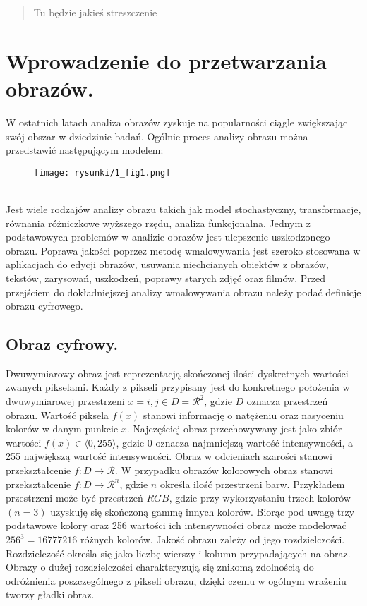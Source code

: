 \documentclass[12pt, twoside, openany]{report}
\theoremstyle{definition}
\begin{document}
\begin{abstract}
Tu będzie jakieś streszczenie
\end{abstract}

\newpage
\printunsrtglossary[type=symbols, style=long, title={Wykaz oznaczeń i symboli}]
    

\chapter{Wprowadzenie do przetwarzania obrazów.}
W ostatnich latach analiza obrazów zyskuje na popularności ciągle zwiększając swój obszar w dziedzinie badań. Ogólnie proces analizy obrazu można przedstawić następującym modelem: \\
\begin{figure}[!h]
	\centering
	\texttt{[image: rysunki/1\_fig1.png]}
\end{figure}
\\
Jest wiele rodzajów analizy obrazu takich jak model stochastyczny, transformacje, równania różniczkowe wyższego rzędu, analiza funkcjonalna. Jednym z podstawowych problemów w analizie obrazów jest ulepszenie uszkodzonego obrazu. Poprawa jakości poprzez metodę wmalowywania jest szeroko stosowana w aplikacjach do edycji obrazów, usuwania niechcianych obiektów z obrazów, tekstów, zarysowań, uszkodzeń, poprawy starych zdjęć oraz filmów. Przed przejściem do dokładniejszej analizy wmalowywania obrazu należy podać definicje obrazu cyfrowego.
\section{Obraz cyfrowy.}
Dwuwymiarowy obraz jest reprezentacją skończonej ilości dyskretnych wartości zwanych pikselami. Każdy z pikseli przypisany jest do konkretnego położenia w dwuwymiarowej przestrzeni $x = {i,j} \in D=\mathcal{R}^2$, gdzie $D$ oznacza przestrzeń obrazu. Wartość piksela $f(x)$ stanowi informację o natężeniu oraz nasyceniu kolorów w danym punkcie $x$. Najczęściej obraz przechowywany jest jako zbiór wartości $f(x) \in \langle 0,255 \rangle$, gdzie 0 oznacza najmniejszą wartość intensywności, a 255 największą wartość intensywności. Obraz w odcieniach szarości stanowi przekształcenie $f: D \rightarrow \mathcal{R}$. W przypadku obrazów kolorowych obraz stanowi przekształcenie $f: D \rightarrow \mathcal{R}^n$, gdzie $n$ określa ilość przestrzeni barw. Przykładem przestrzeni może być przestrzeń $RGB$, gdzie przy wykorzystaniu trzech kolorów $(n=3)$ uzyskuję się skończoną gammę innych kolorów. Biorąc pod uwagę trzy podstawowe kolory oraz 256 wartości ich intensywności obraz może modelować $256^3=16777216$ różnych kolorów. Jakość obrazu zależy od jego rozdzielczości. Rozdzielczość określa się jako liczbę wierszy i kolumn przypadających na obraz. Obrazy o dużej rozdzielczości charakteryzują się znikomą zdolnością do odróżnienia poszczególnego z pikseli obrazu, dzięki czemu w ogólnym wrażeniu tworzy gładki obraz.
\end{document}
